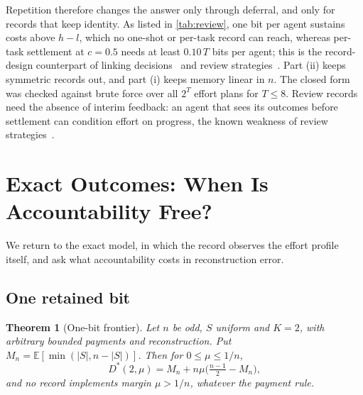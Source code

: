 \documentclass[sigconf,anonymous,acmthm=false]{acmart}
\theoremstyle{acmplain}
\newtheorem{theorem}{Theorem}
\theoremstyle{acmdefinition}
\newcommand{\E}{\mathbb{E}}
\begin{document}
Repetition therefore changes the answer only through deferral, and only for records that keep
identity. As listed in \cref{tab:review}, one bit per agent sustains costs above $h-l$, which no
one-shot or per-task record can reach, whereas per-task settlement at $c=0.5$ needs at least
$0.10\,T$ bits per agent; this is the record-design counterpart of linking
decisions~\cite{jacksonsonnenschein2007} and review strategies~\cite{radner1985repeated}.
Part (ii) keeps symmetric records out, and part (i) keeps memory linear in $n$. The closed form
was checked against brute force over all $2^T$ effort plans for $T\le8$. Review records need
the absence of interim feedback: an agent that sees its outcomes before settlement can condition
effort on progress, the known weakness of review strategies~\cite{radner1985repeated}.

\section{Exact Outcomes: When Is Accountability Free?}\label{sec:exact}


We return to the exact model, in which the record observes the effort profile itself, and
ask what accountability costs in reconstruction error.

\subsection{One retained bit}\label{sec:onebit}

\begin{theorem}[One-bit frontier]\label{thm:onebit}
Let $n$ be odd, $S$ uniform and $K=2$, with arbitrary bounded payments and reconstruction.
Put $M_n=\E[\min(|S|,n-|S|)]$. Then for $0\le\mu\le1/n$,
\[ D^*(2,\mu)=M_n+n\mu\Big(\tfrac{n-1}{2}-M_n\Big), \]
and no record implements margin $\mu>1/n$, whatever the payment rule.
\end{theorem}
\end{document}
